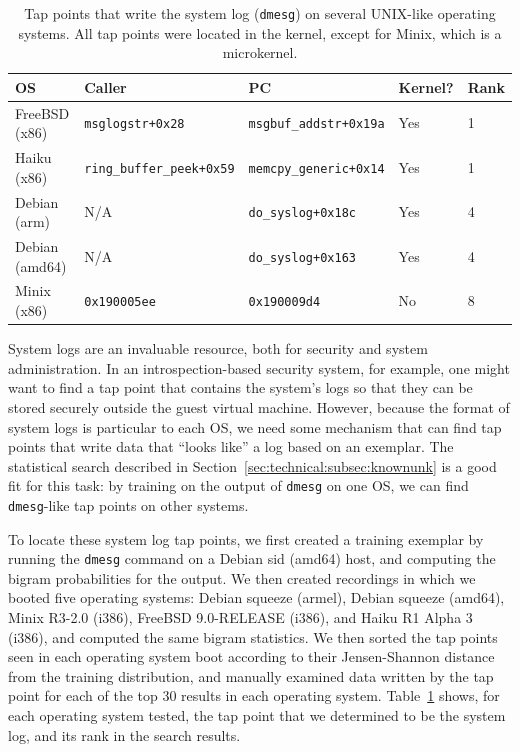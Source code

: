 \begin{table}
    \centering
    \small
    \begin{tabular}{|l|l|l|l|l|}
        \hline
        OS & Caller & PC & Kernel? & Rank \\
        \hline
        FreeBSD (x86) & \texttt{msglogstr+0x28} & \texttt{msgbuf\_addstr+0x19a} & Yes & 1 \\
        Haiku (x86) & \texttt{ring\_buffer\_peek+0x59} & \texttt{memcpy\_generic+0x14} & Yes & 1 \\
        Debian (arm) & N/A & \texttt{do\_syslog+0x18c} & Yes & 4 \\
        Debian (amd64) & N/A & \texttt{do\_syslog+0x163} & Yes & 4 \\ 
        Minix (x86) & \texttt{0x190005ee} & \texttt{0x190009d4} & No & 8 \\
        \hline
    \end{tabular}
\caption{Tap points that write the system log (\texttt{dmesg}) on
several UNIX-like operating systems. All tap points were located in the
kernel, except for Minix, which is a microkernel.}
\label{tbl:dmesg}
\end{table}

System logs are an invaluable resource, both for security and system
administration. In an introspection-based security system, for example,
one might want to find a tap point that contains the system's logs so
that they can be stored securely outside the guest virtual machine.
However, because the format of system logs is particular to each OS, we
need some mechanism that can find tap points that write data that
``looks like'' a log based on an exemplar. The statistical search
described in Section~\ref{sec:technical:subsec:knownunk} is a good fit
for this task: by training on the output of \texttt{dmesg} on one
OS, we can find \texttt{dmesg}-like tap points on other systems.

To locate these system log tap points, we first created a training
exemplar by running the \texttt{dmesg} command on a Debian sid (amd64)
host, and computing the bigram probabilities for the output. We then
created recordings in which we booted five operating systems: Debian
squeeze (armel), Debian squeeze (amd64), Minix R3-2.0 (i386), FreeBSD
9.0-RELEASE (i386), and Haiku R1 Alpha 3 (i386), and computed the same
bigram statistics. We then sorted the tap points seen in each operating
system boot according to their Jensen-Shannon distance from the training
distribution, and manually examined data written by the tap point for
each of the top 30 results in each operating system. Table~\ref{tbl:dmesg}
shows, for each operating system tested, the tap point that we determined to be
the system log, and its rank in the search results.

